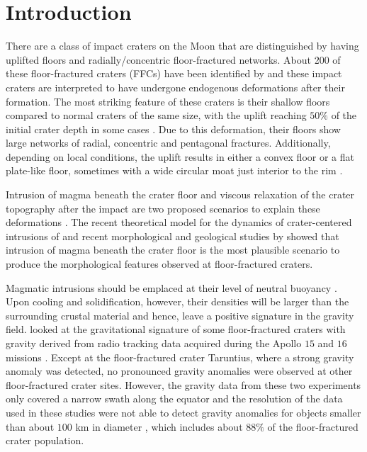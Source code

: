 \section{Introduction}
\label{C6-sec:introduction}
  
There are a class of impact craters on the Moon that are distinguished
by  having  uplifted  floors and  radially/concentric  floor-fractured
networks.  About 200 of these floor-fractured craters (FFCs) have been
identified  by \citet{Schultz:1976kt}  and  these  impact craters  are
interpreted  to have  undergone  endogenous  deformations after  their
formation.   The  most striking  feature  of  these craters  is  their
shallow floors compared  to normal craters of the same  size, with the
uplift  reaching $50\%$  of the  initial  crater depth  in some  cases
\citep{Schultz:1976kt}.  Due  to this  deformation, their  floors show
large  networks  of  radial,   concentric  and  pentagonal  fractures.
Additionally,  depending on  local conditions,  the uplift  results in
either a  convex floor or  a flat  plate-like floor, sometimes  with a
wide     circular     moat     just    interior     to     the     rim
\citep{Schultz:1976kt,Jozwiak:2012dq}.

Intrusion of magma beneath the  crater floor and viscous relaxation of
the crater topography  after the impact are two  proposed scenarios to
explain                       these                       deformations
\citep{Schultz:1976kt,Hall:1981kl,Wichman:1995ju,Dombard:2001gs}.  The
recent  theoretical   model  for   the  dynamics   of  crater-centered
intrusions  of  \citet{Thorey:2014cv}  and  recent  morphological  and
geological studies by \citet{Jozwiak:2012dq}  showed that intrusion of
magma  beneath the  crater floor  is  the most  plausible scenario  to
produce  the   morphological  features  observed   at  floor-fractured
craters.
  
Magmatic  intrusions should  be  emplaced at  their  level of  neutral
buoyancy   \citep{Walker:1989jq,Taisne:2009kj,Wichman:1995ju}.    Upon
cooling and  solidification, however,  their densities will  be larger
than  the surrounding  crustal material  and hence,  leave a  positive
signature in the gravity  field.  \citet{Schultz:1976kt} looked at the
gravitational signature  of some floor-fractured craters  with gravity
derived from radio  tracking data acquired during the  Apollo $15$ and
$16$  missions \citep{Sjogren:1972kk,Sjogren:1974ij}.   Except at  the
floor-fractured crater  Taruntius, where a strong  gravity anomaly was
detected,  no  pronounced gravity  anomalies  were  observed at  other
floor-fractured crater  sites.  However,  the gravity data  from these
two experiments only covered a narrow  swath along the equator and the
resolution of the  data used in these studies were  not able to detect
gravity anomalies for objects smaller  than about $100$ km in diameter
\citep{Schultz:1976kt,Sjogren:1974ij}, which includes  about $88\%$ of
the floor-fractured crater population.

